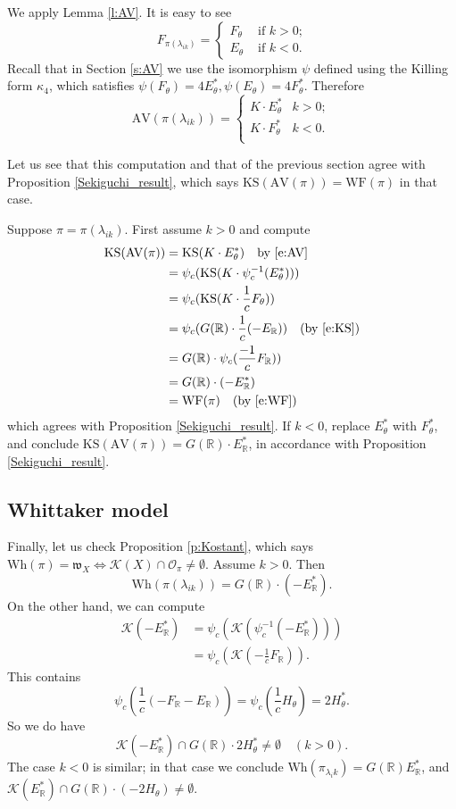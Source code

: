 \documentclass[10pt,leqno]{article}
\numberwithin{equation}{section}
\renewcommand{\O}{\mathcal O}
\newcommand{\R}{\mathbb R}
\newcommand{\K}{\mathcal K}
\newcommand\inv{^{-1}}
\newcommand{\w}{\mathfrak w}
\newcommand{\AV}{\mathrm{AV}}
\newcommand{\KS}{\mathrm{KS}}
\newcommand{\Wh}{\mathrm{Wh}}
\newcommand{\WF}{\mathrm{WF}}
\begin{document}
We apply Lemma \ref{l:AV}. It is easy to see
$$
F_{\pi(\lambda_{ik})}=
\begin{cases} F_\theta&\text{ if $k>0$;}\\
  E_\theta& \text{ if $k<0$.}
\end{cases}
$$
Recall that in Section \ref{s:AV} we use the isomorphism $\psi$ defined using the Killing form $\kappa_4$, which satisfies
$\psi(F_\theta)=4E^*_\theta, \psi(E_\theta)=4F^*_\theta$. 
Therefore
\begin{equation}
  \label{e:AV}
\AV(\pi(\lambda_{ik}))=
\begin{cases}K\cdot E_\theta^*&k>0;\\
  K\cdot F_\theta^*&k<0.\\
\end{cases}
\end{equation}

Let us see that this computation and that of the previous section agree with Proposition \ref{Sekiguchi_result}, which says $\KS(\AV(\pi))=\WF(\pi)$ in that case.

Suppose $\pi=\pi(\lambda_{ik})$. First assume $k>0$ and compute
$$
\begin{aligned}
\KS(\AV(\pi))&=  \KS(K\cdot E_\theta^*)\quad \text{by \eqref{e:AV}}\\
&=  \psi_c(\KS(K\cdot \psi_c\inv (E_\theta^*)))\\
  &=  \psi_c(\KS(K\cdot \frac 1c F_\theta))\\
&=\psi_c(G(\R)\cdot \frac 1c(-E_\R))\quad\text{(by \eqref{e:KS})}\\
&=  G(\R)\cdot \psi_c(\frac{-1}c F_\R))\\
&=G(\R)\cdot (-E_\R^*)\\
&=\WF(\pi)\quad \text{(by \eqref{e:WF})}
\end{aligned}
$$
which agrees with 
Proposition \ref{Sekiguchi_result}. If $k<0$, replace $E_\theta^*$ with $F_\theta^*$, and conclude $\KS(\AV(\pi))=G(\R)\cdot E_\R^*$, in accordance with
Proposition \ref{Sekiguchi_result}.

\subsection{Whittaker model}


Finally, let us check Proposition \ref{p:Kostant}, 
which says $\Wh(\pi)=\w_X\Leftrightarrow \K(X)\cap\O_\pi\ne \emptyset$. 
Assume $k>0$. Then 
$$
\Wh(\pi(\lambda_{ik}))=G(\R)\cdot(-E_\R^*).
$$
On the other hand, we can compute
$$
\begin{aligned}
\K(-E_\R^*)&=\psi_c(\K(\psi_c\inv(-E_\R^*)))\\
&=\psi_c(\K( -\frac 1cF_\R)).\end{aligned}$$
This contains
$$ \psi_c\left(\frac 1c(-F_\R-E_\R)\right)=\psi_c(\frac 1cH_\theta)=2H_\theta^*.
$$
So we do have
$$
\K(-E_\R^*)\cap G(\R)\cdot 2H_{\theta}^*\ne\emptyset\quad (k>0).
$$
The case $k<0$ is similar; in that case we conclude
$\Wh(\pi_{\lambda_ik})=G(\R)E_\R^*$, and $\K(E_\R^*)\cap G(\R)\cdot (-2H_\theta)\ne \emptyset$.







\end{document}
